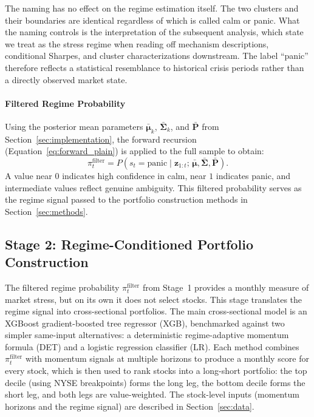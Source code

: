 The naming has no effect on the regime estimation itself. The two clusters and their boundaries are identical regardless of which is called calm or panic. What the naming controls is the interpretation of the subsequent analysis, which state we treat as the stress regime when reading off mechanism descriptions, conditional Sharpes, and cluster characterizations downstream. The label ``panic'' therefore reflects a statistical resemblance to historical crisis periods rather than a directly observed market state.

\paragraph{Filtered Regime Probability}\label{sec:trading_signal}

Using the posterior mean parameters $\bar{\boldsymbol{\mu}}_k$, $\bar{\boldsymbol{\Sigma}}_k$, and $\bar{\mathbf{P}}$ from Section~\ref{sec:implementation}, the forward recursion (Equation~\ref{eq:forward_plain}) is applied to the full sample to obtain:
\begin{equation}
\pi_t^{\text{filter}}
=
P(s_t=\text{panic} \mid \mathbf{z}_{1:t};\,\bar{\boldsymbol{\mu}},\bar{\boldsymbol{\Sigma}},\bar{\mathbf{P}}).
\end{equation}
A value near $0$ indicates high confidence in calm, near $1$ indicates panic, and intermediate values reflect genuine ambiguity. This filtered probability serves as the regime signal passed to the portfolio construction methods in Section~\ref{sec:methods}.

\subsection{Stage 2: Regime-Conditioned Portfolio Construction}\label{sec:stage2}

The filtered regime probability $\pi_t^{\text{filter}}$ from Stage~1 provides a monthly measure of market stress, but on its own it does not select stocks. This stage translates the regime signal into cross-sectional portfolios. The main cross-sectional model is an XGBoost gradient-boosted tree regressor (XGB), benchmarked against two simpler same-input alternatives: a deterministic regime-adaptive momentum formula (DET) and a logistic regression classifier (LR). Each method combines $\pi_t^{\text{filter}}$ with momentum signals at multiple horizons to produce a monthly score for every stock, which is then used to rank stocks into a long-short portfolio: the top decile (using NYSE breakpoints) forms the long leg, the bottom decile forms the short leg, and both legs are value-weighted. The stock-level inputs (momentum horizons and the regime signal) are described in Section~\ref{sec:data}.

